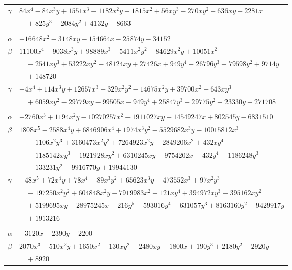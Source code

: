 \documentclass[11pt]{article}
\begin{document}
\begin{longtable}{@{}ll@{}}
$\gamma$ & $84x^{4}-84x^{3}y+1551x^{3}-1182x^{2}y+1815x^{2}+56xy^{3}-270xy^{2}-636xy+2281x$\\
 & $\quad +825y^{3}-2084y^{2}+4132y-8663$\\
\addlinespace[3pt]
\multicolumn{2}{@{}l}{$\{i,j\}=\{2,94\}$, $k_{ij}=2^{4}\cdot 3^{4}\cdot 5\cdot 7\cdot 13$}\\
$\alpha$ & $-16648x^{2}-3148xy-154664x-25874y-34152$\\
$\beta$ & $11100x^{4}-9038x^{3}y+98889x^{3}+5411x^{2}y^{2}-84629x^{2}y+10051x^{2}$\\
 & $\quad -2541xy^{3}+53222xy^{2}-48124xy+27426x+949y^{4}-26796y^{3}+79598y^{2}+9714y$\\
 & $\quad +148720$\\
$\gamma$ & $-4x^{4}+114x^{3}y+12657x^{3}-329x^{2}y^{2}-14675x^{2}y+39700x^{2}+643xy^{3}$\\
 & $\quad +6059xy^{2}-29779xy-99505x-949y^{4}+25847y^{3}-29775y^{2}+23330y-271708$\\
\addlinespace[3pt]
\multicolumn{2}{@{}l}{$\{i,j\}=\{2,95\}$, $k_{ij}=2^{7}\cdot 3^{2}\cdot 7\cdot 13^{2}$}\\
$\alpha$ & $-2760x^{3}+1194x^{2}y-10270257x^{2}-1911027xy+14549247x+802545y-6831510$\\
$\beta$ & $1808x^{5}-2588x^{4}y+6846906x^{4}+1974x^{3}y^{2}-5529682x^{3}y-10015812x^{3}$\\
 & $\quad -1106x^{2}y^{3}+3160473x^{2}y^{2}+7264923x^{2}y-2849206x^{2}+432xy^{4}$\\
 & $\quad -1185142xy^{3}-1921928xy^{2}+6310245xy-9754202x-432y^{4}+1186248y^{3}$\\
 & $\quad -133231y^{2}-9916770y+19944130$\\
$\gamma$ & $-48x^{5}+72x^{4}y+78x^{4}-89x^{3}y^{2}+65623x^{3}y-473552x^{3}+97x^{2}y^{3}$\\
 & $\quad -197250x^{2}y^{2}+604848x^{2}y-7919983x^{2}-121xy^{4}+394972xy^{3}-395162xy^{2}$\\
 & $\quad +5199695xy-28975245x+216y^{5}-593016y^{4}-631057y^{3}+8163160y^{2}-9429917y$\\
 & $\quad +1913216$\\
\addlinespace[3pt]
\multicolumn{2}{@{}l}{$\{i,j\}=\{2,193\}$, $k_{ij}=2^{4}\cdot 3^{3}\cdot 5$}\\
$\alpha$ & $-3120x-2390y-2200$\\
$\beta$ & $2070x^{3}-510x^{2}y+1650x^{2}-130xy^{2}-2480xy+1800x+190y^{3}+2180y^{2}-2920y$\\
 & $\quad +8920$\\

\end{longtable}
\end{document}
